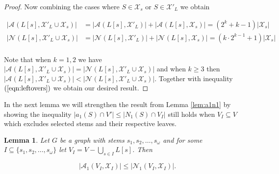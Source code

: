 \documentclass[11pt]{article}
\newtheorem{lemma}[definition]{Lemma}
\newcommand{\A}[3][\mathcal{D}_G]{\mathcal{A}_{#3}(#2, #1)}
\newcommand{\N}[3][\mathcal{D}_G]{\mathcal{N}_{#3}(#2, #1)}
\begin{document}
\begin{proof}
Now combining the cases where $S \in \mathcal{X}_{s}$ or $S \in \mathcal{X}'_{L}$ we obtain

\vspace{-6mm}

\begin{align*}
|\A[\mathcal{X}'_{L} \cup \mathcal{X}_{s}]{L[s]}{}| &= |\A[\mathcal{X}'_{L}]{L[s]}{}|+|\A[\mathcal{X}_{s}]{L[s]}{}|=(2^{k}+k-1)|\mathcal{X}_{s}|\\
|\N[\mathcal{X}'_{L} \cup \mathcal{X}_{s}]{L[s]}{}| &= |\N[\mathcal{X}'_{L}]{L[s]}{}|+|\N[\mathcal{X}_{s}]{L[s]}{}|=(k \cdot 2^{k-1}+1)|\mathcal{X}_{s}|\\
\end{align*}

\vspace{-6mm}

\noindent Note that when $k=1,2$ we have $|\A[\mathcal{X}'_{L} \cup \mathcal{X}_{s}]{L[s]}{}|=|\N[\mathcal{X}'_{L} \cup \mathcal{X}_{s}]{L[s]}{}|$ and when $k \geq 3$ then $|\A[\mathcal{X}'_{L} \cup \mathcal{X}_{s}]{L[s]}{}|<|\N[\mathcal{X}'_{L} \cup \mathcal{X}_{s}]{L[s]}{}|$. Together with inequality $( \ref{eqn:leftovers})$ we obtain our desired result.



\end{proof}

In the next lemma we will strengthen the result from Lemma \ref{lem:a1n1} by showing the inequality $|a_1(S) \cap V'| \leq |N_1(S) \cap V_{I}|$ still holds when $V_{I} \subseteq V$ which excludes selected stems and their respective leaves.





\begin{lemma}
\label{lem:a1n1_v2}
Let $G$ be a graph with stems $s_1, s_2, \ldots, s_{\omega}$ and for some $I \subseteq \{s_1, s_2, \ldots, s_{\omega}\}$ let $V_{I} = V - \bigcup\limits_{s \in I}L[s]$. Then 

$$|\A[\mathcal{X}_I]{V_I}{1}| \leq |\N[\mathcal{X}_I]{V_I}{1}|.$$

\end{lemma}
\end{document}
